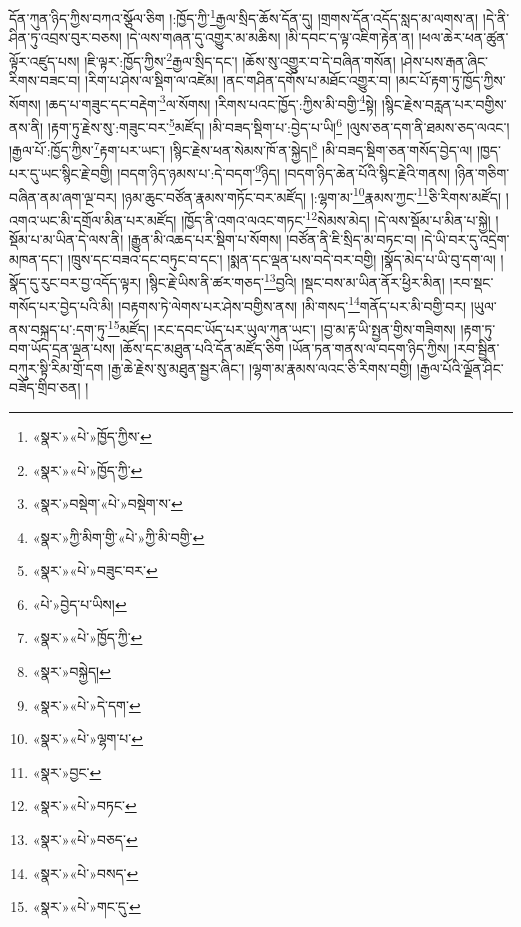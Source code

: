 དོན་ཀུན་ཉིད་ཀྱིས་བཀའ་སྩོལ་ཅིག །:ཁྱོད་ཀྱི་\footnote{«སྣར་»«པེ་»ཁྱོད་ཀྱིས་}རྒྱལ་སྲིད་ཆོས་དོན་དུ། །གྲགས་དོན་འདོད་སླད་མ་ལགས་ན། །དེ་ནི་ཤིན་ཏུ་འབྲས་བུར་བཅས། །དེ་ལས་གཞན་དུ་འགྱུར་མ་མཆིས། །མི་དབང་ད་ལྟ་འཇིག་རྟེན་ན། །ཕལ་ཆེར་ཕན་ཚུན་ལྟོར་འཛུད་པས། །ཇི་ལྟར་:ཁྱོད་ཀྱིས་\footnote{«སྣར་»«པེ་»ཁྱོད་ཀྱི་}རྒྱལ་སྲིད་དང་། །ཆོས་སུ་འགྱུར་བ་དེ་བཞིན་གསོན། །ཤེས་པས་རྒན་ཞིང་རིགས་བཟང་བ། །རིག་པ་ཤེས་ལ་སྡིག་ལ་འཛེམ། །ནང་གཤིན་དགོས་པ་མཐོང་འགྱུར་བ། །མང་པོ་རྟག་ཏུ་ཁྱོད་ཀྱིས་སོགས། །ཆད་པ་གཟུང་དང་བརྡེག་\footnote{«སྣར་»བསྡེག་«པེ་»བསྡེག་ས་}ལ་སོགས། །རིགས་པའང་ཁྱོད་:ཀྱིས་མི་བགྱི་\footnote{«སྣར་»ཀྱི་མིག་གྱི་«པེ་»ཀྱི་མི་བགྱི་}སྟེ། །སྙིང་རྗེས་བརླན་པར་བགྱིས་ནས་ནི། །རྟག་ཏུ་རྗེས་སུ་:གཟུང་བར་\footnote{«སྣར་»«པེ་»བཟུང་བར་}མཛོད། །མི་བཟད་སྡིག་པ་:བྱེད་པ་ཡི།\footnote{«པེ་»བྱེད་པ་ཡིས།} །ལུས་ཅན་དག་ནི་ཐམས་ཅད་ལའང་། །རྒྱལ་པོ་:ཁྱོད་ཀྱིས་\footnote{«སྣར་»«པེ་»ཁྱོད་ཀྱི་}རྟག་པར་ཡང་། །སྙིང་རྗེས་ཕན་སེམས་ཁོ་ན་སྐྱེད།\footnote{«སྣར་»བསྐྱེད།} །མི་བཟད་སྡིག་ཅན་གསོད་བྱེད་ལ། །ཁྱད་པར་དུ་ཡང་སྙིང་རྗེ་བགྱི། །བདག་ཉིད་ཉམས་པ་:དེ་བདག་\footnote{«སྣར་»«པེ་»དེ་དག་}ཉིད། །བདག་ཉིད་ཆེན་པོའི་སྙིང་རྗེའི་གནས། །ཉིན་གཅིག་བཞིན་ནམ་ཞག་ལྔ་བར། །ཉམ་ཆུང་བཙོན་རྣམས་གཏོང་བར་མཛོད། །:ལྷག་མ་\footnote{«སྣར་»«པེ་»ལྷག་པ་}རྣམས་ཀྱང་\footnote{«སྣར་»བྱང་}ཅི་རིགས་མཛོད། །འགའ་ཡང་མི་དགྲོལ་མིན་པར་མཛོད། །ཁྱོད་ནི་འགའ་ལའང་གཏང་\footnote{«སྣར་»«པེ་»བཏང་}སེམས་མེད། །དེ་ལས་སྡོམ་པ་མིན་པ་སྐྱེ། །སྡོམ་པ་མ་ཡིན་དེ་ལས་ནི། །རྒྱུན་མི་འཆད་པར་སྡིག་པ་སོགས། །བཙོན་ནི་ཇི་སྲིད་མ་བཏང་བ། །དེ་ཡི་བར་དུ་འདྲེག་མཁན་དང་། །ཁྲུས་དང་བཟའ་དང་བཏུང་བ་དང་། །སྨན་དང་ལྡན་པས་བདེ་བར་བགྱི། །སྣོད་མེད་པ་ཡི་བུ་དག་ལ། །སྣོད་དུ་རུང་བར་བྱ་འདོད་ལྟར། །སྙིང་རྗེ་ཡིས་ནི་ཚར་གཅད་\footnote{«སྣར་»«པེ་»བཅད་}བྱའི། །སྡང་བས་མ་ཡིན་ནོར་ཕྱིར་མིན། །རབ་སྡང་གསོད་པར་བྱེད་པའི་མི། །བརྟགས་ཏེ་ལེགས་པར་ཤེས་བགྱིས་ནས། །མི་གསད་\footnote{«སྣར་»«པེ་»བསད་}གནོད་པར་མི་བགྱི་བར། །ཡུལ་ནས་བསྐྲད་པ་:དག་ཏུ་\footnote{«སྣར་»«པེ་»གང་དུ་}མཛོད། །རང་དབང་ཡོད་པར་ཡུལ་ཀུན་ཡང་། །བྱ་མ་རྟ་ཡི་སྤྱན་གྱིས་གཟིགས། །རྟག་ཏུ་བག་ཡོད་དྲན་ལྡན་པས། །ཆོས་དང་མཐུན་པའི་དོན་མཛོད་ཅིག །ཡོན་ཏན་གནས་ལ་བདག་ཉིད་ཀྱིས། །རབ་སྦྱིན་བཀུར་སྟི་རིམ་གྲོ་དག །རྒྱ་ཆེ་རྗེས་སུ་མཐུན་སྦྱར་ཞིང་། །ལྷག་མ་རྣམས་ལའང་ཅི་རིགས་བགྱི། །རྒྱལ་པོའི་ལྗོན་ཤིང་བཟོད་གྲིབ་ཅན། །
